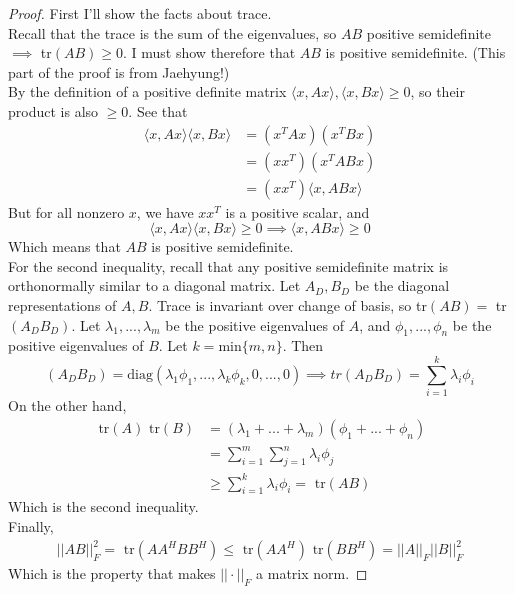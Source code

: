 \documentclass[12pt]{amsart}
\newenvironment{problem}[2][Problem]{\begin{trivlist}
\item[\hskip \labelsep {\bfseries #1}\hskip \labelsep {\bfseries #2.}]}{\end{trivlist}}
\begin{document}
\begin{problem}{28}
\begin{proof}
First I'll show the facts about trace. \\ Recall that the trace is the sum of the eigenvalues, so $AB$ positive semidefinite $\implies$ tr$(AB) \geq 0$. I must show therefore that $AB$ is positive semidefinite. (This part of the proof is from Jaehyung!)\\
By the definition of a positive definite matrix $\langle x, Ax \rangle, \langle x, Bx\rangle \geq 0$, so their product is also $ \geq 0$. See that
\begin{align*}
\langle x, Ax \rangle \langle x, Bx \rangle &= (x^TAx)(x^TBx) \\
&= (xx^T)(x^TABx) \\
&= (xx^T) \langle x, ABx \rangle
\end{align*}
But for all nonzero $x$, we have $xx^T$ is a positive scalar, and
$$ \langle x, Ax \rangle \langle x, Bx \rangle \geq 0 \implies \langle x, ABx \rangle \geq 0 $$
Which means that $AB$ is positive semidefinite. \\
For the second inequality, recall that any positive semidefinite matrix is orthonormally similar to a diagonal matrix. Let $A_D, B_D$ be the diagonal representations of $A, B$. Trace is invariant over change of basis, so tr$(AB) = $ tr$(A_DB_D)$. Let $\lambda_1, ..., \lambda_m$ be the positive eigenvalues of $A$, and $\phi_1, ..., \phi_n$ be the positive eigenvalues of $B$. Let $k = \text{min}\{m, n\}$. Then $$(A_DB_D) = \text{diag}(\lambda_1\phi_1, ..., \lambda_k\phi_k, 0 ,..., 0) \implies tr(A_DB_D) = \sum_{i=1}^k \lambda_i\phi_i $$
On the other hand,
\begin{align*}
\text{ tr}(A)\text{ tr}(B) &= (\lambda_1 + ... + \lambda_m)(\phi_1 + ... + \phi_n) \\
&= \sum_{i=1}^{m} \sum_{j=1}^n \lambda_i \phi_j \\
&\geq \sum_{i=1}^k \lambda_i\phi_i = \text{ tr}(AB)
\end{align*}
Which is the second inequality. \\
Finally,
\begin{align*}
||AB||_F^2 = \text{ tr}(AA^HBB^H) \leq \text{ tr}(AA^H) \text{ tr}(BB^H) = ||A||_F ||B||_F^2
\end{align*}
Which is the property that makes $|| \cdot ||_F$ a matrix norm.
\end{proof}
\end{problem}
\end{document}
